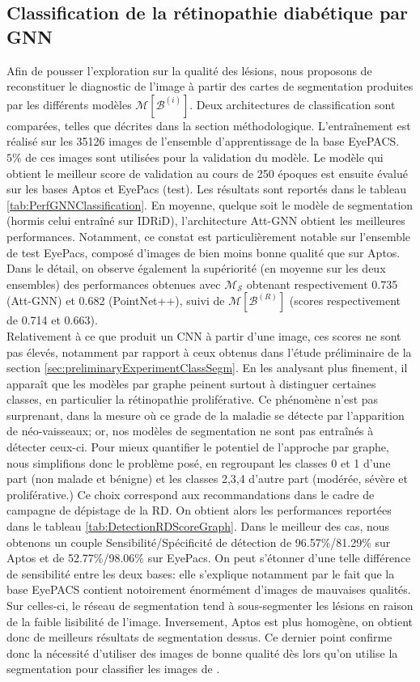 \subsection{Classification de la rétinopathie diabétique par \ac{GNN}}
Afin de pousser l'exploration sur la qualité des lésions, nous proposons de reconstituer le diagnostic de l'image à partir des cartes de segmentation produites par les différents modèles $\mathcal{M}[\mathcal{B}^{(i)}]$. Deux architectures de classification sont comparées, telles que décrites dans la section méthodologique. L'entraînement est réalisé sur les 35126 images de l'ensemble d'apprentissage de la base EyePACS. $5\%$ de ces images sont utilisées pour la validation du modèle. Le modèle qui obtient le meilleur score de validation au cours de 250 époques est ensuite évalué sur les bases Aptos et EyePacs (test). 
Les résultats sont  reportés dans le tableau \ref{tab:PerfGNNClassification}. En moyenne, quelque soit le modèle de segmentation (hormis celui entraîné sur IDRiD), l'architecture Att-GNN obtient les meilleures performances. Notamment, ce constat est particulièrement notable sur l'ensemble de test EyePacs, composé d'images de bien moins bonne qualité que sur Aptos.
\\
Dans le détail, on observe également la supériorité (en moyenne sur les deux ensembles) des performances obtenues avec $\mathcal{M}_\mathcal{S}$ obtenant respectivement 0.735 (Att-GNN) et 0.682 (PointNet++), suivi de $\mathcal{M}[\mathcal{B}^{(R)}]$ (scores respectivement de 0.714 et 0.663). \\
Relativement à ce que produit un CNN à partir d'une image, ces scores ne sont pas élevés, notamment par rapport à ceux obtenus dans l'étude préliminaire de la section \ref{sec:preliminaryExperimentClassSegm}. En les analysant plus finement, il apparaît que les modèles par graphe peinent surtout à distinguer certaines classes, en particulier la rétinopathie proliférative. Ce phénomène n'est pas surprenant, dans la mesure où ce grade de la maladie se détecte par l'apparition de néo-vaisseaux; or, nos modèles de segmentation ne sont pas entraînés à détecter ceux-ci. Pour mieux quantifier le potentiel de l'approche par graphe, nous simplifions donc le problème posé, en regroupant les classes 0 et 1 d'une part (non malade et bénigne) et les classes 2,3,4 d'autre part (modérée, sévère et proliférative.) Ce choix correspond aux recommandations dans le cadre de campagne de dépistage de la \ac{RD}. On obtient alors les performances reportées dans le tableau \ref{tab:DetectionRDScoreGraph}. Dans le meilleur des cas, nous obtenons un couple Sensibilité/Spécificité de détection de 96.57\%/81.29\% sur Aptos et de 52.77\%/98.06\% sur EyePacs. On peut s'étonner d'une telle différence de sensibilité entre les deux bases: elle s'explique notamment par le fait que la base EyePACS contient notoirement énormément d'images de mauvaises qualités. Sur celles-ci, le réseau de segmentation tend à sous-segmenter les lésions en raison de la faible lisibilité de l'image. Inversement, Aptos est plus homogène, on obtient donc de meilleurs résultats de segmentation dessus. Ce dernier point confirme donc la nécessité d'utiliser des images de bonne qualité dès lors qu'on utilise la segmentation pour classifier les images de \fundus{}.

